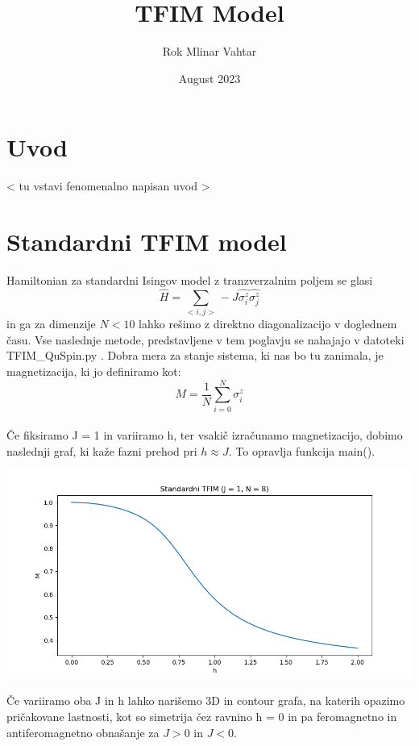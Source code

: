 \documentclass{article}
\title{\HUGE TFIM Model}
\author{Rok Mlinar Vahtar}
\date{August 2023}
\begin{document}
\maketitle

\section{Uvod}
\textless \hspace{1pt} tu vstavi fenomenalno napisan uvod \textgreater

\section{Standardni TFIM model}
Hamiltonian za standardni Isingov model z tranzverzalnim poljem se glasi
\begin{equation}
    \hat{H} = \sum_{< i,j >} -J \hat{\sigma_i^z} \hat{\sigma_j^z}
\end{equation}
in ga za dimenzije $N < 10$ lahko rešimo z direktno diagonalizacijo v doglednem času. Vse naslednje metode, predstavljene v tem poglavju se nahajajo v datoteki TFIM\_QuSpin.py . Dobra mera za stanje sistema, ki nas bo tu zanimala, je magnetizacija, ki jo definiramo kot:
\begin{equation}
    M = \frac{1}{N}\sum_{i=0}^N \sigma_i^z
\end{equation}\\
Če fiksiramo J = 1 in variiramo h, ter vsakič izračunamo magnetizacijo, dobimo naslednji graf, ki kaže fazni prehod pri $h \approx J$. To opravlja funkcija main().

\includegraphics[width = \linewidth]{STFIM1.png}

\newpage
\noindent Če variiramo oba J in h lahko narišemo 3D in contour grafa, na katerih opazimo pričakovane lastnosti, kot so simetrija čez ravnino h = 0 in pa feromagnetno in antiferomagnetno obnašanje za $J > 0$ in $J < 0$.\\\\
\end{document}

